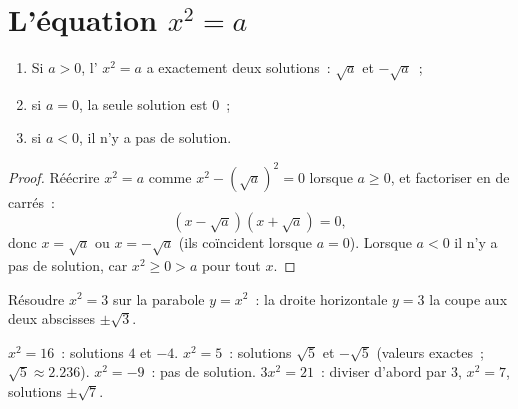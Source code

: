 \section{L'équation \texorpdfstring{$x^2 = a$}{x2 = a}}

\begin{theorem}[Résoudre $x^2 = a$]\label{thm:g9:sqrt:equation}
\begin{enumerate}
  \item Si $a > 0$, l' $x^2 = a$ a exactement deux solutions~:
        $\sqrt a$ et $-\sqrt a$~;
  \item si $a = 0$, la seule solution est $0$~;
  \item si $a < 0$, il n'y a pas de solution.
\end{enumerate}
\end{theorem}

\begin{proof}
Réécrire $x^2 = a$ comme $x^2 - \left(\sqrt a\right)^2 = 0$ lorsque
$a \geq 0$, et factoriser en  de carrés~:
\[
\left(x - \sqrt a\right)\left(x + \sqrt a\right) = 0 ,
\]
donc $x = \sqrt a$ ou $x = -\sqrt a$ (ils coïncident lorsque $a = 0$).
Lorsque $a < 0$ il n'y a pas de solution, car $x^2 \geq 0 > a$ pour tout
$x$.
\end{proof}

\begin{omfigure}

{\small Résoudre $x^2 = 3$ sur la parabole $y = x^2$~: la droite
horizontale $y = 3$ la coupe aux deux abscisses $\pm\sqrt3$.}
\end{omfigure}

\begin{example}
$x^2 = 16$~: solutions $4$ et $-4$. \quad
$x^2 = 5$~: solutions $\sqrt5$ et $-\sqrt5$ (valeurs exactes~; $\sqrt5
\approx 2.236$). \quad
$x^2 = -9$~: pas de solution. \quad
$3x^2 = 21$~: diviser d'abord par 3, $x^2 = 7$, solutions $\pm\sqrt7$.
\end{example}

